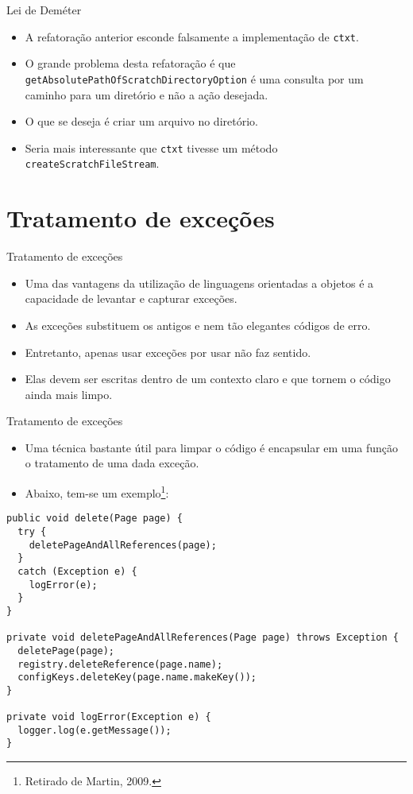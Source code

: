 \documentclass[11pt]{beamer}
\begin{document}
  \begin{frame}[fragile]{Lei de Deméter}
    \begin{itemize}
      \item A refatoração anterior esconde falsamente a implementação de \verb|ctxt|.
      \item O grande problema desta refatoração é que \verb|getAbsolutePathOfScratchDirectoryOption| é uma consulta por um caminho para um diretório e não a ação desejada.
      \item O que se deseja é criar um arquivo no diretório.
      \item Seria mais interessante que \verb|ctxt| tivesse um método \verb|createScratchFileStream|.
    \end{itemize}
  \end{frame}

  \section{Tratamento de exceções}

  \begin{frame}{Tratamento de exceções}
    \begin{itemize}
      \item Uma das vantagens da utilização de linguagens orientadas a objetos é a capacidade de levantar e capturar exceções.
      \item As exceções substituem os antigos e nem tão elegantes códigos de erro.
      \item Entretanto, apenas usar exceções por usar não faz sentido.
      \item Elas devem ser escritas dentro de um contexto claro e que tornem o código ainda mais limpo.
    \end{itemize}
  \end{frame}
  
  \begin{frame}[fragile]{Tratamento de exceções}
    \begin{itemize}
      \item Uma técnica bastante útil para limpar o código é encapsular em uma função o tratamento de uma dada exceção.
      \item Abaixo, tem-se um exemplo\footnote{Retirado de Martin, 2009.}:
    \end{itemize}
    \begin{lstlisting}[basicstyle=\tiny]
public void delete(Page page) {
  try {
    deletePageAndAllReferences(page);
  }
  catch (Exception e) {
    logError(e);
  }
}

private void deletePageAndAllReferences(Page page) throws Exception {
  deletePage(page);
  registry.deleteReference(page.name);
  configKeys.deleteKey(page.name.makeKey());
}

private void logError(Exception e) {
  logger.log(e.getMessage());
}
    \end{lstlisting}
  \end{frame}
\end{document}
